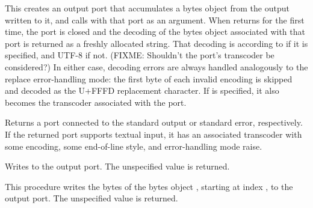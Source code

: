 \begin{entry}{%
}
   
 This
creates an output port that accumulates a bytes object from the output
written to it, and calls  with that port as an argument.
When  returns for the first time, the port is closed and the
decoding of the bytes object associated with that port is returned as
a freshly allocated string.  That decoding is according to
 if it is specified, and UTF-8 if not.
(FIXME: Shouldn't the port's transcoder be considered?)
In either
case, decoding errors are always handled analogously to the {\cf
  replace} error-handling mode: the first byte of each invalid
encoding is skipped and decoded as the U+FFFD replacement character.
If  is specified, it also becomes the transcoder
associated with the port.
\end{entry}

\begin{entry}{%
}
   
Returns a port connected to the standard output or standard error,
respectively. If the returned port supports textual input, it has an
associated transcoder with some encoding, some end-of-line style, and
error-handling mode {\cf raise}.
\end{entry}

\begin{entry}{%
}

Writes  to the output port. The unspecified value is returned.
\end{entry}

\begin{entry}{%
}
   
  This procedure writes the
 bytes of the bytes object , starting at index
, to the output port. The unspecified value is returned.
\end{entry}

